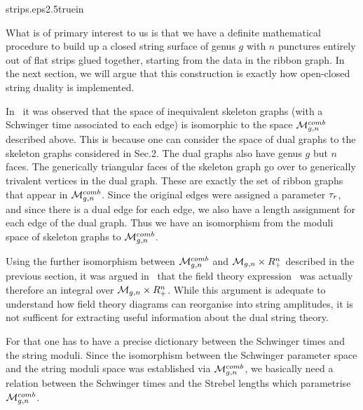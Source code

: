 %
{strips.eps}{2.5truein}
%

What is of primary interest to us is that we have  
a definite mathematical procedure to build up
a closed string surface of genus $g$ with $n$ punctures entirely 
out of flat strips glued together, starting from the data in the 
ribbon graph. In the next section, we will argue that this construction
is exactly how open-closed string duality is implemented. 


In \ffb\ it was observed that the space of inequivalent skeleton graphs
(with a Schwinger time associated to each edge) is isomorphic to the space 
${\cal M}_{g,n}^{comb}$ described above. This is because one can consider 
the space of dual graphs to the skeleton graphs considered in Sec.2. 
The dual graphs also have genus $g$ but $n$ faces. The generically triangular  
faces of the skeleton graph go over to generically trivalent vertices 
in the dual graph. These are exactly the set of ribbon graphs that appear 
in ${\cal M}_{g,n}^{comb}$. Since the original edges were assigned a 
parameter ${\tau}_r$, and since there is a dual edge for each edge, 
we also have a length assignment for each edge of the dual graph.
Thus we have an isomorphism 
from the moduli space of skeleton graphs to ${\cal M}_{g,n}^{comb}$.

Using the further isomorphism between ${\cal M}_{g,n}^{comb}$ and 
${\cal M}_{g,n}\times R_+^n$ described in the previous section, 
it was 
argued in \ffb\ that the field theory expression \schem\ was actually 
therefore an
integral over ${\cal M}_{g,n}\times R_+^n$. While this argument is adequate 
to understand how field theory diagrams can 
reorganise into string amplitudes, it is not sufficent for 
extracting useful information about the dual string theory.

For that one has to have a precise dictionary between the 
Schwinger times and the string moduli. 
Since the isomorphism between the Schwinger parameter space 
and the string moduli space
was established via ${\cal M}_{g,n}^{comb}$, we basically need
a relation between  
the Schwinger times and the Strebel lengths 
which parametrise ${\cal M}_{g,n}^{comb}$. 


